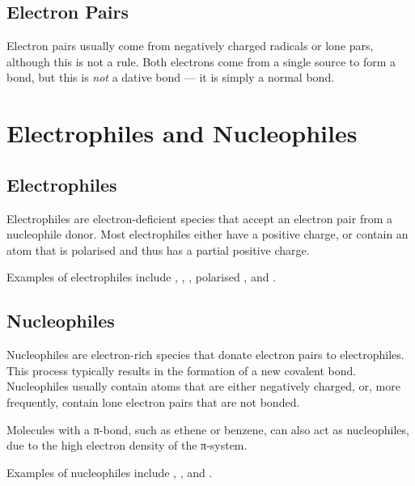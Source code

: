 

		\subsection{Electron Pairs}

			Electron pairs usually come from negatively charged radicals or lone pars, although this is not a rule.
			Both electrons come from a single source to form a bond, but this is \textit{not} a dative bond --- it is simply a normal
			bond.




	\pagebreak
	\section{Electrophiles and Nucleophiles}
		\subsection{Electrophiles}

			Electrophiles are electron-deficient species that accept an electron pair from a nucleophile donor. Most electrophiles
			either have a positive charge, or contain an atom that is polarised and thus has a partial positive charge.

			Examples of electrophiles include , , , polarised , and .


		\subsection{Nucleophiles}

			Nucleophiles are electron-rich species that donate electron pairs to electrophiles. This process typically results
			in the formation of a new covalent bond. Nucleophiles usually contain atoms that are either negatively charged, or,
			more frequently, contain lone electron pairs that are not bonded.

			Molecules with a π-bond, such as ethene or benzene, can also act as nucleophiles, due to the high electron
			density of the π-system.

			Examples of nucleophiles include , , and .


















